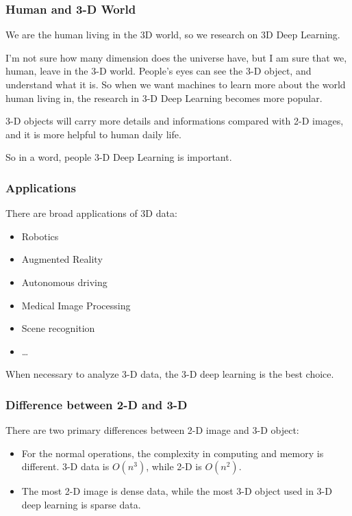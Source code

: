 \documentclass[border=0.5in]{blog}
\begin{document}
    \subsubsection{Human and 3-D World}
    \label{sec:rbm:bm:human}
    
    We are the human living in the 3D world, so we research on 3D Deep Learning.
    
    I'm not sure how many dimension does the universe have, but I am sure that
    we, human, leave in the 3-D world.
    People's eyes can see the 3-D object, and understand what it is.
    So when we want machines to learn more about the world human living in,
    the research in 3-D Deep Learning becomes more popular.
    
    3-D objects will carry more details and informations compared with 2-D images,
    and it is more helpful to human daily life.
    
    So in a word, people 3-D Deep Learning is important.
    
    \subsubsection{Applications}
    \label{sec:rbm:bm:application}
    
    There are broad applications of 3D data:
    \begin{itemize}
        \item Robotics
        \item Augmented Reality
        \item Autonomous driving
        \item Medical Image Processing
        \item Scene recognition
        \item \dots
    \end{itemize}
    When necessary to analyze 3-D data, the 3-D deep learning is the best choice.
    
    \subsubsection{Difference between 2-D and 3-D}
    \label{sec:rbm:bm:2d-d-3d}
    
    There are two primary differences between 2-D image and 3-D object:
    \begin{itemize}
        \item For the normal operations, the complexity in computing and memory
            is different. 3-D data is $O(n^3)$, while 2-D is $O(n^2)$.
        \item The most 2-D image is dense data, while the most 3-D object used in
            3-D deep learning is sparse data.
    \end{itemize}
\end{document}
